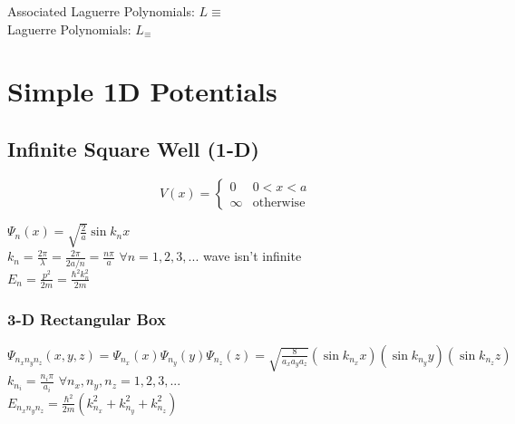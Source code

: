 \documentclass[12pt]{article}
\begin{document}
\vspace{30pt}\noindent
Associated Laguerre Polynomials: \hspace{18pt} \( \displaystyle
    L \equiv 
\) \\[10pt]
Laguerre Polynomials: \hspace{18pt} \( \displaystyle
    L_ \equiv 
\)


\newpage
\section{Simple 1D Potentials}

\subsection{Infinite Square Well (1-D)}
\boldmath \[ V(x) = \begin{cases}
    0 & 0<x<a \\
    \infty & \text{otherwise}
\end{cases} \] \unboldmath 

\vspace{15pt}\noindent
\( \displaystyle \Psi_n(x) = \sqrt{\frac{2}{a}} \sin{k_nx} \) \\[20pt]
\( \displaystyle k_n = \frac{2 \pi}{\lambda} = \frac{2 \pi}{2a/n} = \frac{n \pi}{a}\)
    \hspace{18pt} \( \forall n=1, 2, 3, ...\)         
    \hspace{18pt} \hspace{18pt}  
    \hspace{18pt} {\scriptsize wave isn't infinite} \\[20pt]
\( \displaystyle E_n = \frac{p^2}{2m} = \frac{\hbar^2 k_n^2}{2m}\)

\vspace{15pt}
\subsubsection{3-D Rectangular Box}
\( \displaystyle \Psi_{n_x n_y n_z}(x,y,z) = \Psi_{n_x}(x) \Psi_{n_y}(y) \Psi_{n_z}(z) 
    = \sqrt{\frac{8}{a_x a_y a_z}} (\sin{k_{n_x} x}) (\sin{k_{n_y} y}) (\sin{k_{n_z} z}) \) \\[20pt]
\( \displaystyle k_{n_i} = \frac{n_i \pi}{a_i}\)
    \hspace{18pt} \( \forall n_x, n_y, n_z = 1, 2, 3, ...\) \\[20pt]
\( \displaystyle E_{n_x n_y n_z} = \frac{\hbar^2}{2m} (k_{n_x}^2 + k_{n_y}^2 + k_{n_z}^2) \) 
\end{document}
